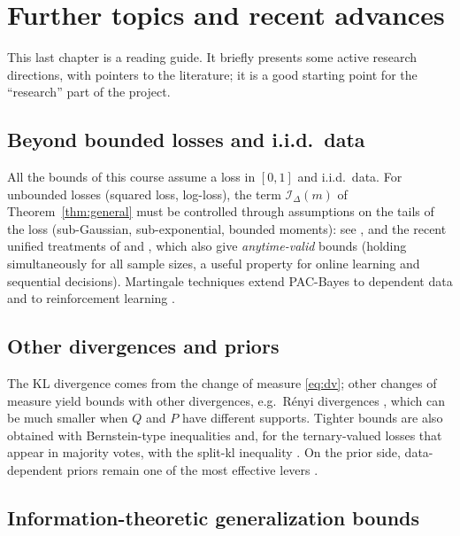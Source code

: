 \chapter{Further topics and recent advances}
\label{chap:advances}

This last chapter is a reading guide. It briefly presents some active research
directions, with pointers to the literature; it is a good starting point for
the ``research'' part of the project.

\section{Beyond bounded losses and i.i.d.\ data}

All the bounds of this course assume a loss in $[0,1]$ and i.i.d.\ data. For
unbounded losses (squared loss, log-loss), the term $\mathcal I_\Delta(m)$ of
Theorem~\ref{thm:general} must be controlled through assumptions on the tails of the
loss (sub-Gaussian, sub-exponential, bounded moments):
see \citet{alquier2016properties}, \citet{germain2016pac} and the recent
unified treatments of \citet{rodriguez2024more} and \citet{chugg2023unified}, which
also give \emph{anytime-valid} bounds (holding simultaneously for all sample
sizes, a useful property for online learning and sequential decisions).
Martingale techniques extend PAC-Bayes to dependent data and to reinforcement
learning \citep{seldin2012pac,chugg2023unified}.

\section{Other divergences and priors}

The KL divergence comes from the change of measure \eqref{eq:dv}; other
changes of measure yield bounds with other divergences, e.g.\ Rényi
divergences \citep{begin2016pac}, which can be much smaller when $Q$ and $P$
have different supports. Tighter bounds are also obtained with Bernstein-type
inequalities \citep{tolstikhin2013pac,mhammedi2019pac} and, for the
ternary-valued losses that appear in majority votes, with the split-kl
inequality \citep{wu2022split}. On the prior side, data-dependent priors
remain one of the most effective levers
\citep{parrado2012pac,dziugaite2018data,perez2021tighter}.

\section{Information-theoretic generalization bounds}


